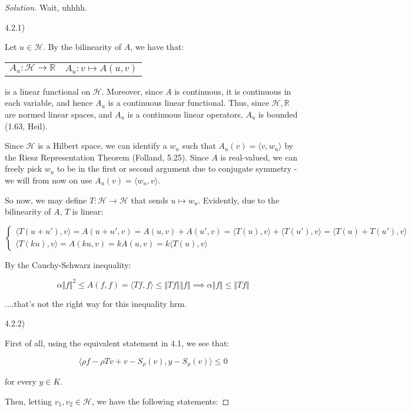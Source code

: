 \documentclass[10pt]{article}
\begin{document}
\begin{proof}[Solution]
Wait, uhhhh.

4.2.1)

Let $u  \in \mathcal{H}$. By the bilinearity of $A$, we have that:
\begin{center}
\begin{tabular}{c c} $A_u : \mathcal{H} \to \mathbb{R}$ & $A_u: v \mapsto A(u,v) $\end{tabular}
\end{center}

is a linear functional on $\mathcal{H}$. Moreover, since $A$ is continuous, it is continuous in each variable, and hence $A_u$ is a continuous linear functional. Thus, since $\mathcal{H}, \mathbb{R}$ are normed linear spaces, and $A_u$ is a continuous linear operators, $A_u$ is bounded (1.63, Heil).

Since $\mathcal{H}$ is a Hilbert space, we can identify a $w_u$ such that $A_u(v) = \langle v, w_u \rangle$ by the Riesz Representation Theorem (Folland, 5.25). Since $A$ is real-valued, we can freely pick $w_u$ to be in the first or second argument due to conjugate symmetry - we will from now on use $A_u(v) = \langle w_u, v\rangle$.

So now, we may define $T: \mathcal{H} \to \mathcal{H}$ that sends $u \mapsto w_u$. Evidently, due to the bilinearity of $A$, $T$ is linear:

$$\begin{cases} \langle T(u + u'), v \rangle = A(u + u', v) = A(u, v) + A(u', v) = \langle T(u), v \rangle + \langle T(u'), v \rangle = \langle T(u) + T(u'), v \rangle \\ \langle T(ku), v \rangle =A(ku, v) = k A(u, v) = k \langle T(u), v \rangle \end{cases} $$ 

By the Cauchy-Schwarz inequality:

$$\alpha \Vert f \Vert^2 \leq A(f,f) = \langle Tf, f \rangle \leq \Vert Tf \Vert \Vert f \Vert \implies \alpha \Vert f \Vert \leq \Vert Tf \Vert $$

....that's not the right way for this inequality hrm.

4.2.2)

First of all, using the equivalent statement in 4.1, we see that:

$$ \langle \rho f - \rho Tv + v - S_\rho(v), y - S_\rho(v) \rangle \leq 0$$

for every $y \in K$.

Then, letting $v_1, v_2 \in \mathcal{H}$, we have the following statements:


\end{proof}
\end{document}
